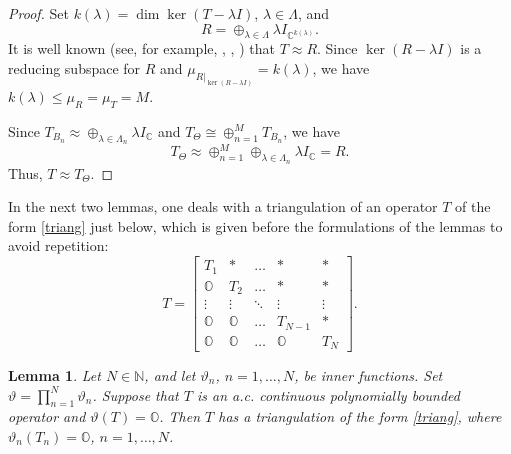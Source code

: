 \documentclass[a4paper,oneside,11pt]{amsart}
\numberwithin{equation}{section}
\theoremstyle{plain}
\newtheorem{lemma}[theorem]{Lemma}
\theoremstyle{definition}
\begin{document}
\begin{proof} Set $k(\lambda)=\dim\ker (T-\lambda I)$, $\lambda\in\Lambda$, and  
 \begin{equation*} R=\oplus_{\lambda\in\Lambda}\lambda I_{\mathbb C^{k(\lambda)}}.
\end{equation*} 
It is well known (see, for example, {\cite[proof of Theorem 2.1]{cassierest}}, {\cite[Corollary 3.3]{clouatre11}}, 
{\cite[Lemma 2.3]{vitse}})
that $T\approx R$. Since $\ker (R-\lambda I)$ is a reducing subspace for $R$ and $\mu_{R|_{\ker (R-\lambda I)}}=k(\lambda)$, 
we have $k(\lambda)\leq \mu_R=\mu_T=M$. 

Since $T_{B_n}\approx\oplus_{\lambda\in\Lambda_n}\lambda I_{\mathbb C}$ and 
$T_\Theta\cong \oplus_{n=1}^M T_{B_n}$, we have  
\begin{equation*} T_\Theta\approx \oplus_{n=1}^M\oplus_{\lambda\in\Lambda_n}\lambda I_{\mathbb C}=R.
\end{equation*} 
Thus, $T\approx T_\Theta$.  
\end{proof}


In the next two lemmas, one deals with  a triangulation of an operator $T$ of the form \eqref{triang} just below, 
 which is given before the formulations of the lemmas to avoid repetition: 
\begin{equation}\label{triang} T=\left[ \begin{matrix} T_1  & * & \ldots & * & * \\ 
\mathbb O & T_2 & \ldots & * & * \\ \vdots & \vdots & \ddots & \vdots & \vdots \\
\mathbb O & \mathbb O & \ldots & T_{N-1} & * \\ \mathbb O & \mathbb O & \ldots & \mathbb O & T_N
 \end{matrix}\right]. 
\end{equation} 


\begin{lemma} \label{lemthetacc0}   Let $N\in\mathbb N$,  and let $\vartheta_n$, $n=1,\ldots, N$, be inner functions. 
 Set $\vartheta=\prod_{n=1}^N \vartheta_n$. Suppose that  $T$ is an a.c. continuous polynomially bounded operator 
and $\vartheta(T)=\mathbb O$. Then $T$ has a triangulation of the form \eqref{triang},  
where $\vartheta_n(T_n)=\mathbb O$,  $n=1,\ldots, N$. 
\end{lemma}
\end{document}
